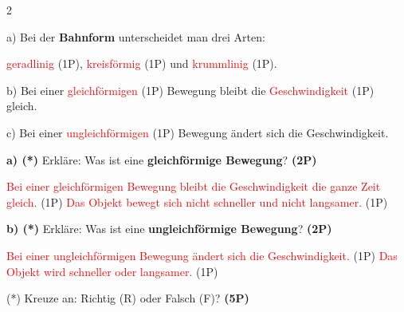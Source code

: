\documentclass[11pt,a4paper]{article}
\begin{document}
\begin{multicols}{2}
\begin{tcolorbox}[title={2: Lückentext Grundbegriffe}]
\vspace{1mm}
\scriptsize
\begin{center}
\end{center}

\small
\vspace{2mm}
a) Bei der \textbf{Bahnform} unterscheidet man drei Arten: 

\textcolor{red}{geradlinig} {\color{blue}(1P)}, \textcolor{red}{kreisförmig} {\color{blue}(1P)} und \textcolor{red}{krummlinig} {\color{blue}(1P)}.

\vspace{3mm}
b) Bei einer \textcolor{red}{gleichförmigen} {\color{blue}(1P)} Bewegung bleibt die \textcolor{red}{Geschwindigkeit} {\color{blue}(1P)} gleich.

\vspace{3mm}
c) Bei einer \textcolor{red}{ungleichförmigen} {\color{blue}(1P)} Bewegung ändert sich die Geschwindigkeit.
\end{tcolorbox}

\begin{tcolorbox}[title={3: Erkläre die Begriffe}]
\small
\textbf{a) (*)} Erkläre: Was ist eine \textbf{gleichförmige Bewegung}? \textbf{(2P)}

\textcolor{red}{Bei einer gleichförmigen Bewegung bleibt die Geschwindigkeit die ganze Zeit gleich.} {\color{blue}(1P)} \textcolor{red}{Das Objekt bewegt sich nicht schneller und nicht langsamer.} {\color{blue}(1P)}

\vspace{4mm}
\textbf{b) (*)} Erkläre: Was ist eine \textbf{ungleichförmige Bewegung}? \textbf{(2P)}

\textcolor{red}{Bei einer ungleichförmigen Bewegung ändert sich die Geschwindigkeit.} {\color{blue}(1P)} \textcolor{red}{Das Objekt wird schneller oder langsamer.} {\color{blue}(1P)}
\end{tcolorbox}

\columnbreak

\begin{tcolorbox}[title={4: Richtig oder Falsch?}]
\small
(*) Kreuze an: Richtig (R) oder Falsch (F)? \textbf{(5P)}


\end{tcolorbox}
\end{multicols}
\end{document}
